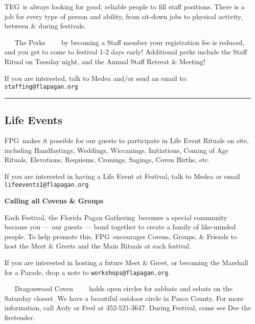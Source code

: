 \documentclass[9pt,twoside,openright,final,article]{memoir}
\def\fpg{{\beltanefamily FPG\ }}
\def\teg{{\hminfamily TEG\ }}
\def\FPG{{\beltanefamily Florida Pagan Gathering\ }}
\let\oldsection=\section
\renewcommand{\section}[1]{%
  \vspace{3pt}%
  \needspace{1in}%
  { \hrule } \nopagebreak %
  \begin{center}\oldsection{#1}\end{center}\nopagebreak{}}
\renewcommand{\subsection}[1]{%
  \vspace{6pt}%
  \needspace{1.25in}%
  \begin{center}\textbf{\Large \beltanefamily #1}\end{center}

  \nopagebreak}
\renewcommand{\subsubsection}[1]{%
  \vspace{1pt}\needspace{1.5in}
  {\large ~~~\beltanefamily #1~~~\ }
  \nopagebreak}
\begin{document}
\begin{multicols}{2}
  \teg is always looking for good, reliable people to fill staff
  positions. There is a job for every type of person and ability, from
  sit-down jobs to physical activity, between \& during festivals.

  \subsubsection{The Perks} by becoming a Staff member your
  registration fee is reduced, and you get to come to festival 1-2
  days early! Additional perks include the Staff Ritual on Tuesday
  night, and the Annual Staff Retreat \& Meeting!

  If you are interested, talk to Medea and/or send an email to:
  \texttt{staffing@flapagan.org}


  \section{Life Events}

  \fpg makes it possible for our guests to participate in Life
  Event Rituals on site, including Handfastings, Weddings,
  Wiccanings, Initiations, Coming of Age Rituals, Elevations,
  Requiems, Cronings, Sagings, Coven Births, etc.

  If you are interested in having a Life Event at Festival, talk
  to Medea or email \texttt{lifeevents1@flapagan.org}

  \subsection{Calling all Covens \& Groups}

  Each Festival, the \FPG becomes a special community because you ---
  our guests --- bond together to create a family of like-minded
  people. To help promote this, \fpg encourages Covens, Groups, \&
  Friends to host the Meet \& Greets and the Main Rituals at each
  festival.

  If you are interested in hosting a future Meet \& Greet, or becoming
  the Marshall for a Parade, drop a note to
  \texttt{workshops@flapagan.org}.


  \subsubsection{Dragonwood Coven}
  holds open circles for sabbats and esbats on the Saturday
  closest. We have a beautiful outdoor circle in Pasco County.  For
  more information, call Ardy or Fred at 352-521-3647. During
  Festival, come see Dee the firetender.


\end{multicols}
\end{document}
